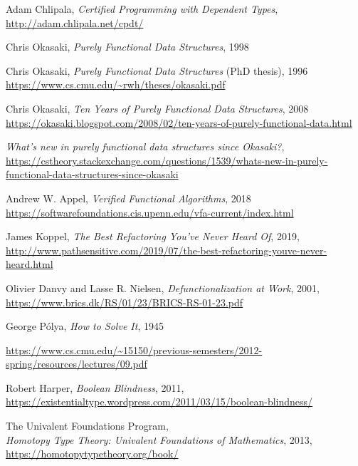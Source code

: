 \documentclass[declaration,mgr,english,shortabstract]{iithesis}
\begin{document}
\begin{thebibliography}{1}
    Adam Chlipala,
    \textit{Certified Programming with Dependent Types}, \\
    \url{http://adam.chlipala.net/cpdt/}

    Chris Okasaki,
    \textit{Purely Functional Data Structures}, 1998

    Chris Okasaki,
    \textit{Purely Functional Data Structures} (PhD thesis), 1996 \\
    \url{https://www.cs.cmu.edu/~rwh/theses/okasaki.pdf}

    Chris Okasaki,
    \textit{Ten Years of Purely Functional Data Structures}, 2008 \\
    \url{https://okasaki.blogspot.com/2008/02/ten-years-of-purely-functional-data.html}

    \textit{What's new in purely functional data structures since Okasaki?}, \\
    \url{https://cstheory.stackexchange.com/questions/1539/whats-new-in-purely-functional-data-structures-since-okasaki}

    Andrew W. Appel,
    \textit{Verified Functional Algorithms}, 2018 \\
    \url{https://softwarefoundations.cis.upenn.edu/vfa-current/index.html}

    James Koppel,
    \textit{The Best Refactoring You've Never Heard Of},
    2019, \\
    \url{http://www.pathsensitive.com/2019/07/the-best-refactoring-youve-never-heard.html}

    Olivier Danvy and Lasse R. Nielsen,
    \textit{Defunctionalization at Work},
    2001, \\
    \url{https://www.brics.dk/RS/01/23/BRICS-RS-01-23.pdf}

    George Pólya, \textit{How to Solve It}, 1945

    \url{https://www.cs.cmu.edu/~15150/previous-semesters/2012-spring/resources/lectures/09.pdf}

    Robert Harper,
    \textit{Boolean Blindness},
    2011, \\
    \url{https://existentialtype.wordpress.com/2011/03/15/boolean-blindness/}

    The Univalent Foundations Program, \\
    \textit{Homotopy Type Theory: Univalent Foundations of Mathematics},
    2013, \\
    \url{https://homotopytypetheory.org/book/}


\end{thebibliography}
\end{document}
